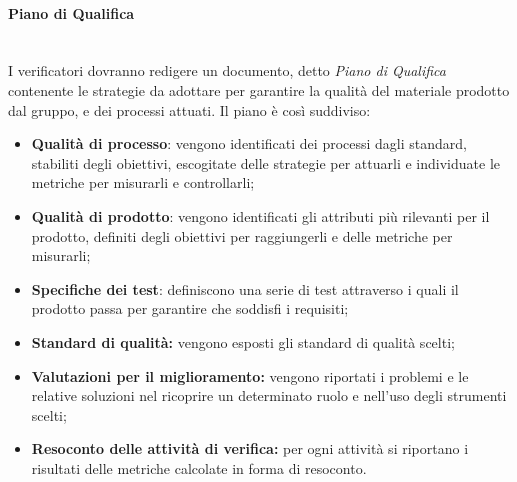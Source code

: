 		\paragraph{Piano di Qualifica} \mbox{}\\
		I verificatori dovranno redigere un documento, detto \textit{Piano di Qualifica} contenente le strategie da adottare per garantire la qualità del materiale prodotto dal gruppo, e dei processi attuati. Il piano è così suddiviso:
		\begin{itemize}
			\item \textbf{Qualità di processo}: vengono identificati dei processi dagli standard, stabiliti degli obiettivi, escogitate delle strategie per attuarli e individuate le metriche per misurarli e controllarli;
			\item \textbf{Qualità di prodotto}: vengono identificati gli attributi più rilevanti per il prodotto, definiti degli obiettivi per raggiungerli e delle metriche per misurarli;
			\item \textbf{Specifiche dei test}: definiscono una serie di test attraverso i quali il prodotto passa per garantire che soddisfi i requisiti;
			\item \textbf{Standard di qualità:} vengono esposti gli standard di qualità scelti;
			\item \textbf{Valutazioni per il miglioramento:} vengono riportati i problemi e le relative soluzioni nel ricoprire un determinato ruolo e nell'uso degli strumenti scelti;
			\item \textbf{Resoconto delle attività di verifica:} per ogni attività si riportano i risultati delle metriche calcolate in forma di resoconto.
		\end{itemize}

     
